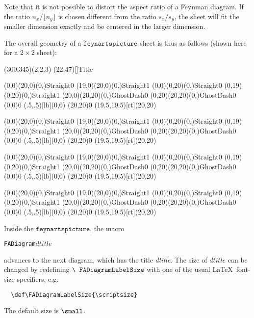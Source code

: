 \documentclass[twoside,12pt]{article}
\def\eg{e.g.\ }
\def\lbrac{\symbol{123}}
\def\rbrac{\symbol{125}}
\def\Brac#1{\lbrac#1\rbrac}
\def\backsl{\symbol{92}}
\def\Code#1{\ensuremath{\texttt{#1}}}
\def\Var#1{\ensuremath{\mathit{#1}}}
\begin{document}
\begin{appendix}
Note that it is not possible to distort the aspect ratio of a 
Feynman diagram.  If the ratio $n_x/\lfloor n_y\rfloor$ is chosen 
different from the ratio $s_x/s_y$, the sheet will fit the smaller 
dimension exactly and be centered in the larger dimension.

The overall geometry of a \Code{feynartspicture} sheet is thus as 
follows (shown here for a $2\times 2$ sheet):
\begin{center}
\vspace*{-3ex}
\begin{feynartspicture}(300,345)(2,2.3)
\FALabel(22,47)[]{\large Title}

\FAProp(0,0)(20,0)(0,){Straight}{0}
\FAProp(19,0)(20,0)(0,){Straight}{1}
\FAProp(0,0)(0,20)(0,){Straight}{0}
\FAProp(0,19)(0,20)(0,){Straight}{1}
\FAProp(20,0)(20,20)(0,){GhostDash}{0}
\FAProp(0,20)(20,20)(0,){GhostDash}{0}
\FAVert(0,0){0}
\FALabel(.5,.5)[lb]{(0,0)}
\FAVert(20,20){0}
\FALabel(19.5,19.5)[rt]{(20,20)}

\FAProp(0,0)(20,0)(0,){Straight}{0}
\FAProp(19,0)(20,0)(0,){Straight}{1}
\FAProp(0,0)(0,20)(0,){Straight}{0}
\FAProp(0,19)(0,20)(0,){Straight}{1}
\FAProp(20,0)(20,20)(0,){GhostDash}{0}
\FAProp(0,20)(20,20)(0,){GhostDash}{0}
\FAVert(0,0){0}
\FALabel(.5,.5)[lb]{(0,0)}
\FAVert(20,20){0}
\FALabel(19.5,19.5)[rt]{(20,20)}

\FAProp(0,0)(20,0)(0,){Straight}{0}
\FAProp(19,0)(20,0)(0,){Straight}{1}
\FAProp(0,0)(0,20)(0,){Straight}{0}
\FAProp(0,19)(0,20)(0,){Straight}{1}
\FAProp(20,0)(20,20)(0,){GhostDash}{0}
\FAProp(0,20)(20,20)(0,){GhostDash}{0}
\FAVert(0,0){0}
\FALabel(.5,.5)[lb]{(0,0)}
\FAVert(20,20){0}
\FALabel(19.5,19.5)[rt]{(20,20)}

\FAProp(0,0)(20,0)(0,){Straight}{0}
\FAProp(19,0)(20,0)(0,){Straight}{1}
\FAProp(0,0)(0,20)(0,){Straight}{0}
\FAProp(0,19)(0,20)(0,){Straight}{1}
\FAProp(20,0)(20,20)(0,){GhostDash}{0}
\FAProp(0,20)(20,20)(0,){GhostDash}{0}
\FAVert(0,0){0}
\FALabel(.5,.5)[lb]{(0,0)}
\FAVert(20,20){0}
\FALabel(19.5,19.5)[rt]{(20,20)}
\end{feynartspicture}
\end{center}
Inside the \Code{feynartspicture}, the macro
\begin{alltt}
   \backsl{}FADiagram\Brac{\(\Var{dtitle}\)}
\end{alltt}
advances to the next diagram, which has the title \textit{dtitle}.  The 
size of \Var{dtitle} can be changed by redefining \Code{\backsl 
FADiagramLabelSize} with one of the usual \LaTeX\ font-size specifiers, 
\eg
\begin{verbatim}
  \def\FADiagramLabelSize{\scriptsize}
\end{verbatim}
The default size is \Code{\backsl small}.



\end{appendix}
\end{document}
